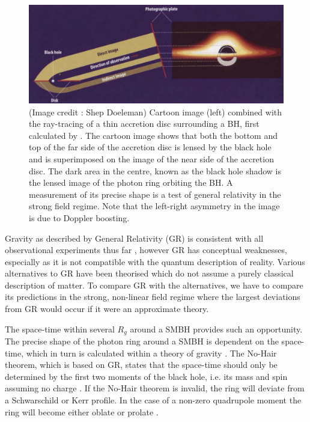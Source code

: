 \begin{figure}[h!]
\includegraphics[width=\columnwidth]{Images/lensed_cartoon}
\caption[Cartoon image combined with the ray-tracing of a thin accretion disc surrounding a BH.  The dark area in the centre, known as the black hole shadow is the lensed image of the photon ring orbiting the BH.]{(Image credit : Shep Doeleman) Cartoon image (left) combined with the ray-tracing of a thin accretion disc surrounding a BH, first calculated by \citet{Luminet_1979}. The cartoon image shows that both the bottom and top of the far side of the accretion disc is lensed by the black hole and is superimposed on the image of the near side of the accretion disc. The dark area in the centre, known as the black hole shadow is the lensed image of the photon ring orbiting the BH. A measurement of its precise shape is a test of general relativity in the strong field regime. Note that the left-right asymmetry in the image is due to Doppler boosting. \label{fig:grmhd}%
}
\end{figure}



Gravity as described by General Relativity (GR) is consistent with all observational experiments thus far \citep[e.g.][and references therein]{Kramer_2006}, however GR has conceptual weaknesses, especially as it is not compatible with the quantum description of reality. Various alternatives to GR have been theorised which do not assume a purely classical description of matter. To compare GR with the alternatives, we have to compare its predictions in the strong, non-linear field regime where the largest deviations from GR would occur if it were an approximate theory.


The space-time within several $R_g$ around a SMBH provides such an opportunity. The precise shape of the photon ring around a SMBH is dependent on the space-time, which in turn is calculated within a theory of gravity \citep{Takahashi_2004}. The No-Hair theorem, which is based on GR, states that the space-time should only be determined by the first two moments of the black hole, i.e. its mass and spin assuming no charge \citep[][and references therein]{Hawking_1972}. If the No-Hair theorem is invalid, the ring will deviate from a Schwarschild or Kerr profile. In the case of a non-zero quadrupole moment the ring will become either oblate or prolate \citep[e.g.][]{Johannsen_2010}. 

